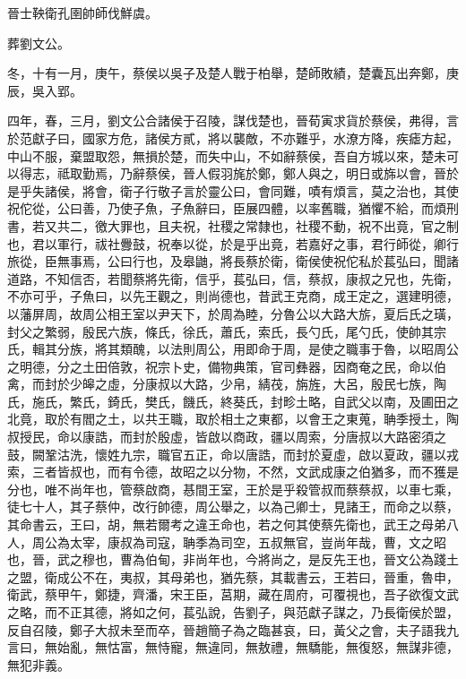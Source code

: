 \begin{pinyinscope}
晉士鞅衛孔圉帥師伐鮮虞。

葬劉文公。

冬，十有一月，庚午，蔡侯以吳子及楚人戰于柏舉，楚師敗績，楚囊瓦出奔鄭，庚辰，吳入郢。

四年，春，三月，劉文公合諸侯于召陵，謀伐楚也，晉荀寅求貨於蔡侯，弗得，言於范獻子曰，國家方危，諸侯方貳，將以襲敵，不亦難乎，水潦方降，疾瘧方起，中山不服，棄盟取怨，無損於楚，而失中山，不如辭蔡侯，吾自方城以來，楚未可以得志，祗取勤焉，乃辭蔡侯，晉人假羽旄於鄭，鄭人與之，明日或旆以會，晉於是乎失諸侯，將會，衛子行敬子言於靈公曰，會同難，嘖有煩言，莫之治也，其使祝佗從，公曰善，乃使子魚，子魚辭曰，臣展四體，以率舊職，猶懼不給，而煩刑書，若又共二，徼大罪也，且夫祝，社稷之常隸也，社稷不動，祝不出竟，官之制也，君以軍行，祓社釁鼓，祝奉以從，於是乎出竟，若嘉好之事，君行師從，卿行旅從，臣無事焉，公曰行也，及皋鼬，將長蔡於衛，衛侯使祝佗私於萇弘曰，聞諸道路，不知信否，若聞蔡將先衛，信乎，萇弘曰，信，蔡叔，康叔之兄也，先衛，不亦可乎，子魚曰，以先王觀之，則尚德也，昔武王克商，成王定之，選建明德，以藩屏周，故周公相王室以尹天下，於周為睦，分魯公以大路大旂，夏后氏之璜，封父之繁弱，殷民六族，條氏，徐氏，蕭氏，索氏，長勺氏，尾勺氏，使帥其宗氏，輯其分族，將其類醜，以法則周公，用即命于周，是使之職事于魯，以昭周公之明德，分之土田倍敦，祝宗卜史，備物典策，官司彝器，因商奄之民，命以伯禽，而封於少皞之虛，分康叔以大路，少帛，綪茷，旃旌，大呂，殷民七族，陶氏，施氏，繁氏，錡氏，樊氏，饑氏，終葵氏，封畛土略，自武父以南，及圃田之北竟，取於有閻之土，以共王職，取於相土之東都，以會王之東蒐，聃季授土，陶叔授民，命以康誥，而封於殷虛，皆啟以商政，疆以周索，分唐叔以大路密須之鼓，闕鞏沽洗，懷姓九宗，職官五正，命以唐誥，而封於夏虛，啟以夏政，疆以戎索，三者皆叔也，而有令德，故昭之以分物，不然，文武成康之伯猶多，而不獲是分也，唯不尚年也，管蔡啟商，惎間王室，王於是乎殺管叔而蔡蔡叔，以車七乘，徒七十人，其子蔡仲，改行帥德，周公舉之，以為己卿士，見諸王，而命之以蔡，其命書云，王曰，胡，無若爾考之違王命也，若之何其使蔡先衛也，武王之母弟八人，周公為太宰，康叔為司寇，聃季為司空，五叔無官，豈尚年哉，曹，文之昭也，晉，武之穆也，曹為伯甸，非尚年也，今將尚之，是反先王也，晉文公為踐土之盟，衛成公不在，夷叔，其母弟也，猶先蔡，其載書云，王若曰，晉重，魯申，衛武，蔡甲午，鄭捷，齊潘，宋王臣，莒期，藏在周府，可覆視也，吾子欲復文武之略，而不正其德，將如之何，萇弘說，告劉子，與范獻子謀之，乃長衛侯於盟，反自召陵，鄭子大叔未至而卒，晉趙簡子為之臨甚哀，曰，黃父之會，夫子語我九言曰，無始亂，無怙富，無恃寵，無違同，無敖禮，無驕能，無復怒，無謀非德，無犯非義。


\end{pinyinscope}
